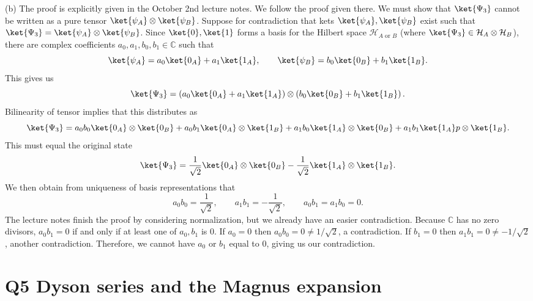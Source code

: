 \documentclass[11pt, letterpaper]{article}
\theoremstyle{plain}
\begin{document}
(b) The proof is explicitly given in the October 2nd lecture notes. We follow the proof given there. We must show that $\ket{\Psi _3}$ cannot be written as a pure tensor $\ket{\psi _A}\otimes \ket{\psi _B}$. Suppose for contradiction that kets $\ket{\psi _A},\ket{\psi _B}$ exist such that $\ket{\Psi _3}=\ket{\psi _A}\otimes \ket{\psi _B}$. Since $\ket{0},\ket{1}$ forms a basis for the Hilbert space $\mathcal{H}_{A\text{ or } B} $ (where $\ket{\Psi _3}\in \mathcal{H}_A \otimes \mathcal{H}_B $), there are complex coefficients $a_0,a_1,b_0,b_1\in\mathbb{C} $ such that
\[
	\ket{\psi _A}=a_0\ket{0_A}+a_1\ket{1_A},\qquad \ket{\psi _B}=b_0\ket{0_B}+b_1\ket{1_B}
.\]
This gives us
\[
	\ket{\Psi _3}=\left( a_0\ket{0_A}+a_1\ket{1_A} \right) \otimes \left( b_0\ket{0_B}+b_1\ket{1_B} \right) 
.\]
Bilinearity of tensor implies that this distributes as
\[
	\ket{\Psi _3}=a_0b_0\ket{0_A}\otimes \ket{0_B}+a_0b_1\ket{0_A}\otimes \ket{1_B}+a_1b_0\ket{1_A}\otimes \ket{0_B}+a_1b_1\ket{1_A}p\otimes \ket{1_B}
.\]
This must equal the original state
\[
	\ket{\Psi _3}=\frac{1}{\sqrt{2} } \ket{0_A}\otimes \ket{0_B}-\frac{1}{\sqrt{2} } \ket{1_A}\otimes \ket{1_B}
.\]
We then obtain from uniqueness of basis representations that
\[
	a_0b_0=\frac{1}{\sqrt{2} } ,\qquad a_1b_1=-\frac{1}{\sqrt{2} } ,\qquad a_0b_1=a_1b_0=0
.\]
The lecture notes finish the proof by considering normalization, but we already have an easier contradiction. Because $\mathbb{C} $ has no zero divisors, $a_0b_1=0$ if and only if at least one of $a_0,b_1$ is 0. If $a_0=0$ then $a_0b_0=0 \neq 1/\sqrt{2} $, a contradiction. If $b_1=0$ then $a_1b_1=0 \neq -1/\sqrt{2} $, another contradiction. Therefore, we cannot have $a_0$ or $b_1$ equal to 0, giving us our contradiction.

\section{Q5 Dyson series and the Magnus expansion}
\end{document}
